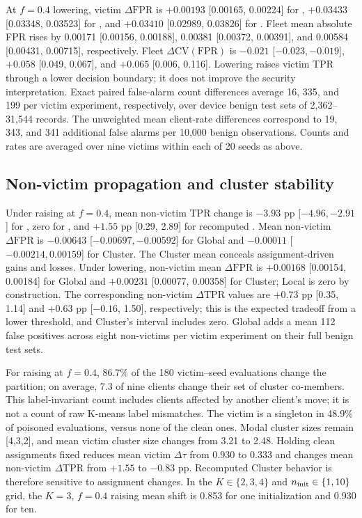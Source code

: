 At $f{=}0.4$ lowering, victim $\Delta\mathrm{FPR}$ is $+0.00193$ [0.00165, 0.00224] for \GLOBAL, $+0.03433$ [0.03348, 0.03523] for \LOCAL, and $+0.03410$ [0.02989, 0.03826] for \CLUSTER. Fleet mean absolute FPR rises by 0.00171 [0.00156, 0.00188], 0.00381 [0.00372, 0.00391], and 0.00584 [0.00431, 0.00715], respectively. Fleet $\Delta\mathrm{CV(FPR)}$ is $-0.021$ [$-0.023,-0.019$], $+0.058$ [0.049, 0.067], and $+0.065$ [0.006, 0.116]. Lowering raises victim TPR through a lower decision boundary; it does not improve the security interpretation. Exact paired false-alarm count differences average 16, 335, and 199 per victim experiment, respectively, over device benign test sets of 2,362--31,544 records. The unweighted mean client-rate differences correspond to 19, 343, and 341 additional false alarms per 10,000 benign observations. Counts and rates are averaged over nine victims within each of 20 seeds as above.

\subsection{Non-victim propagation and cluster stability}
Under raising at $f{=}0.4$, mean non-victim TPR change is $-3.93$ pp [$-4.96,-2.91$] for \GLOBAL, zero for \LOCAL, and $+1.55$ pp [0.29, 2.89] for recomputed \CLUSTER. Mean non-victim $\Delta\mathrm{FPR}$ is $-0.00643$ [$-0.00697,-0.00592$] for Global and $-0.00011$ [$-0.00214,0.00159$] for Cluster. The Cluster mean conceals assignment-driven gains and losses. Under lowering, non-victim mean $\Delta\mathrm{FPR}$ is $+0.00168$ [0.00154, 0.00184] for Global and $+0.00231$ [0.00077, 0.00358] for Cluster; Local is zero by construction. The corresponding non-victim $\Delta\mathrm{TPR}$ values are $+0.73$ pp [0.35, 1.14] and $+0.63$ pp [$-0.16$, 1.50], respectively; this is the expected tradeoff from a lower threshold, and Cluster's interval includes zero. Global adds a mean 112 false positives across eight non-victims per victim experiment on their full benign test sets.

For \CLUSTER raising at $f{=}0.4$, 86.7\% of the 180 victim--seed evaluations change the partition; on average, 7.3 of nine clients change their set of cluster co-members. This label-invariant count includes clients affected by another client's move; it is not a count of raw K-means label mismatches. The victim is a singleton in 48.9\% of poisoned evaluations, versus none of the clean ones. Modal cluster sizes remain [4,3,2], and mean victim cluster size changes from 3.21 to 2.48. Holding clean assignments fixed reduces mean victim $\Delta\tau$ from 0.930 to 0.333 and changes mean non-victim $\Delta\mathrm{TPR}$ from $+1.55$ to $-0.83$ pp. Recomputed Cluster behavior is therefore sensitive to assignment changes. In the $K\in\{2,3,4\}$ and $n_{\rm init}\in\{1,10\}$ grid, the $K{=}3$, $f{=}0.4$ raising mean shift is 0.853 for one initialization and 0.930 for ten.

